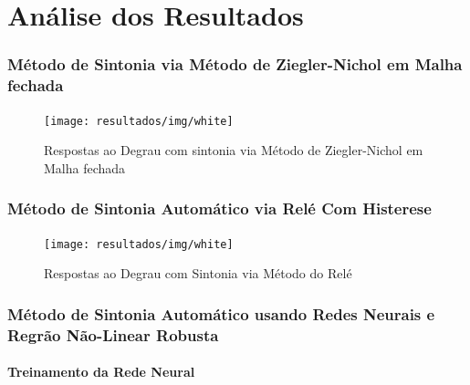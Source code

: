 \chapter{Análise dos Resultados}



\subsection{Método de Sintonia via Método de Ziegler-Nichol em Malha fechada}

\begin{figure}[H]
  \caption{Respostas ao Degrau com sintonia via Método de Ziegler-Nichol em Malha fechada}
  \begin{center}
      \texttt{[image: resultados/img/white]}
  \end{center}
  \label{fig:mpu6050_analisys}
\end{figure}

\subsection{Método de Sintonia Automático via Relé Com Histerese}

\begin{figure}[H]
  \caption{Respostas ao Degrau com Sintonia via Método do Relé}
  \begin{center}
      \texttt{[image: resultados/img/white]}
  \end{center}
  \label{fig:mpu6050_analisys}
\end{figure}

\subsection{Método de Sintonia Automático usando Redes Neurais e Regrão Não-Linear Robusta}

\subsubsection{Treinamento da Rede Neural}

